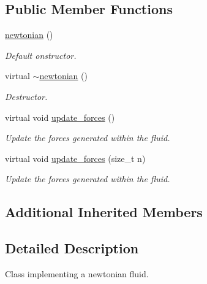 \subsection*{Public Member Functions}
\begin{DoxyCompactItemize}
\item 
\mbox{\label{classphysim_1_1fluids_1_1newtonian_a4a08503213e230d59e56a42fa221d676}} 
\hyperlink{classphysim_1_1fluids_1_1newtonian_a4a08503213e230d59e56a42fa221d676}{newtonian} ()
\begin{DoxyCompactList}\small\item\em Default onstructor. \end{DoxyCompactList}\item 
\mbox{\label{classphysim_1_1fluids_1_1newtonian_a460303778bb2ecb7fd0dbed6f9988422}} 
virtual \hyperlink{classphysim_1_1fluids_1_1newtonian_a460303778bb2ecb7fd0dbed6f9988422}{$\sim$newtonian} ()
\begin{DoxyCompactList}\small\item\em Destructor. \end{DoxyCompactList}\item 
virtual void \hyperlink{classphysim_1_1fluids_1_1newtonian_accfe7d69d2d3985e8ec8c8179a6cf5ba}{update\+\_\+forces} ()
\begin{DoxyCompactList}\small\item\em Update the forces generated within the fluid. \end{DoxyCompactList}\item 
virtual void \hyperlink{classphysim_1_1fluids_1_1newtonian_a2ad3a26c489e0167f16cc4cd2ead981d}{update\+\_\+forces} (size\+\_\+t n)
\begin{DoxyCompactList}\small\item\em Update the forces generated within the fluid. \end{DoxyCompactList}\end{DoxyCompactItemize}
\subsection*{Additional Inherited Members}


\subsection{Detailed Description}
Class implementing a newtonian fluid. 

